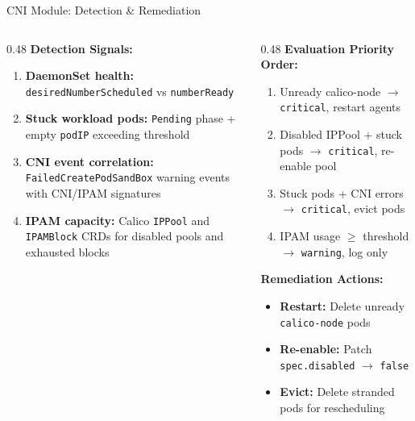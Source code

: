 \documentclass[aspectratio=169, 11pt]{beamer}
\begin{document}
\begin{frame}{CNI Module: Detection \& Remediation}

\begin{columns}[T]
\begin{column}{0.48\textwidth}
\footnotesize
\textbf{Detection Signals:}
\begin{enumerate}
  \item \textbf{DaemonSet health:} \texttt{desiredNumberScheduled} vs \texttt{numberReady}
  \item \textbf{Stuck workload pods:} \texttt{Pending} phase + empty \texttt{podIP} exceeding threshold
  \item \textbf{CNI event correlation:} \texttt{FailedCreatePodSandBox} warning events with CNI/IPAM signatures
  \item \textbf{IPAM capacity:} Calico \texttt{IPPool} and \texttt{IPAMBlock} CRDs for disabled pools and exhausted blocks
\end{enumerate}
\end{column}

\begin{column}{0.48\textwidth}
\footnotesize
\textbf{Evaluation Priority Order:}
\begin{enumerate}
  \item Unready calico-node $\to$ \texttt{critical}, restart agents
  \item Disabled IPPool + stuck pods $\to$ \texttt{critical}, re-enable pool
  \item Stuck pods + CNI errors $\to$ \texttt{critical}, evict pods
  \item IPAM usage $\geq$ threshold $\to$ \texttt{warning}, log only
\end{enumerate}

\vspace{4pt}
\textbf{Remediation Actions:}
\begin{itemize}
  \item[\textcolor{green!60!black}{$\blacksquare$}] \textbf{Restart:} Delete unready \texttt{calico-node} pods
  \item[\textcolor{yellow!70!black}{$\blacksquare$}] \textbf{Re-enable:} Patch \texttt{spec.disabled} $\to$ \texttt{false}
  \item[\textcolor{red!60!black}{$\blacksquare$}] \textbf{Evict:} Delete stranded pods for rescheduling
\end{itemize}
\end{column}
\end{columns}

\end{frame}
\end{document}
